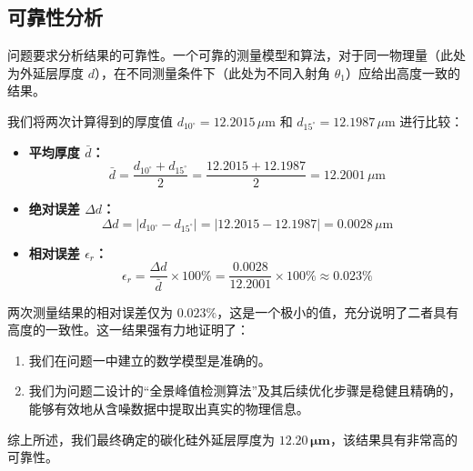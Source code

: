 \documentclass[withoutpreface,bwprint]{cumcmthesis} %
\begin{document}
\subsection{可靠性分析}
问题要求分析结果的可靠性。一个可靠的测量模型和算法，对于同一物理量（此处为外延层厚度 $d$），在不同测量条件下（此处为不同入射角 $\theta_1$）应给出高度一致的结果。

我们将两次计算得到的厚度值 $d_{10^\circ} = 12.2015 \, \mu\text{m}$ 和 $d_{15^\circ} = 12.1987 \, \mu\text{m}$ 进行比较：
\begin{itemize}
    \item \textbf{平均厚度 $\bar{d}$：}
          $$ \bar{d} = \frac{d_{10^\circ} + d_{15^\circ}}{2} = \frac{12.2015 + 12.1987}{2} = 12.2001 \, \mu\text{m} $$
    \item \textbf{绝对误差 $\Delta d$：}
          $$ \Delta d = |d_{10^\circ} - d_{15^\circ}| = |12.2015 - 12.1987| = 0.0028 \, \mu\text{m} $$
    \item \textbf{相对误差 $\epsilon_r$：}
          $$ \epsilon_r = \frac{\Delta d}{\bar{d}} \times 100\% = \frac{0.0028}{12.2001} \times 100\% \approx 0.023\% $$
\end{itemize}

两次测量结果的相对误差仅为 $0.023\%$，这是一个极小的值，充分说明了二者具有高度的一致性。这一结果强有力地证明了：
\begin{enumerate}
    \item 我们在问题一中建立的数学模型是准确的。
    \item 我们为问题二设计的“全景峰值检测算法”及其后续优化步骤是稳健且精确的，能够有效地从含噪数据中提取出真实的物理信息。
\end{enumerate}
综上所述，我们最终确定的碳化硅外延层厚度为 $\mathbf{12.20 \, \mu m}$，该结果具有非常高的可靠性。
\end{document}
